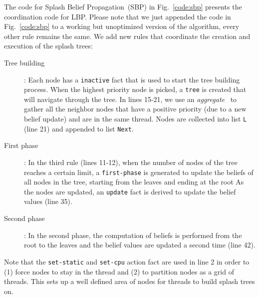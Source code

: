 The code for Splash Belief Propagation~(SBP) in Fig.~\ref{code:sbp} presents the
coordination code for LBP.  Please note that we just appended the code in
Fig.~\ref{code:sbp} to a working but unoptimized version of the algorithm, every
other rule remains the same. We add new rules that coordinate
the creation and execution of the splash trees:

\begin{description}
   \item[Tree building]: Each node has a \texttt{inactive} fact that is used to
   start the tree building process. When the highest priority node is picked, a
   \texttt{tree} is created that will navigate through the tree. In lines 15-21,
   we use an \emph{aggregate}~\cite{cruz-iclp14} to gather all the neighbor
   nodes that have a positive priority (due to a new belief update) and are in the
   same thread. Nodes are collected into list \texttt{L} (line 21) and
   appended to list \texttt{Next}.
   
   \item[First phase]: In the
   third rule (lines 11-12), when the number of nodes of the tree reaches a
   certain limit, a \texttt{first-phase} is generated to update the beliefs of
   all nodes in the tree, starting from the leaves and ending at the root As the
   nodes are updated, an \texttt{update} fact is derived to update the belief
   values (line 35).

   \item[Second phase]: In the second phase, the computation of beliefs is
   performed from the root to the leaves and the belief values are updated a
   second time (line 42).
\end{description}

Note that the \texttt{set-static} and \texttt{set-cpu} action fact are used in
line 2 in order to (1) force nodes to stay in the thread and (2) to partition
nodes as a grid of threads. This sets up a well defined area of nodes
for threads to build splash trees on.

